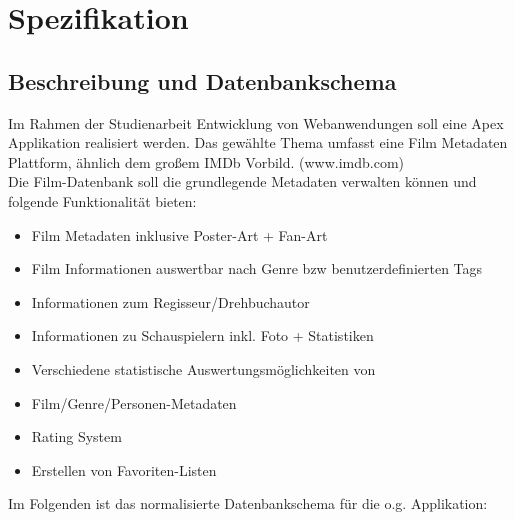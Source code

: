 \chapter{Spezifikation}
\section{Beschreibung und Datenbankschema}
Im Rahmen der Studienarbeit Entwicklung von Webanwendungen soll eine Apex
Applikation realisiert werden. Das gewählte Thema umfasst eine Film Metadaten
Plattform, ähnlich dem großem IMDb Vorbild. (www.imdb.com) 
\\
Die Film-Datenbank soll die grundlegende Metadaten verwalten können und folgende
Funktionalität bieten:
\begin{itemize}
    \item Film Metadaten inklusive Poster-Art + Fan-Art
    \item Film Informationen auswertbar nach Genre bzw benutzerdefinierten Tags
    \item Informationen zum Regisseur/Drehbuchautor
    \item Informationen zu Schauspielern inkl. Foto + Statistiken
    \item Verschiedene statistische Auswertungsmöglichkeiten von
    \item Film/Genre/Personen-Metadaten
    \item Rating System
    \item Erstellen von Favoriten-Listen
\end{itemize}
Im Folgenden ist das normalisierte Datenbankschema für die o.g. Applikation:

